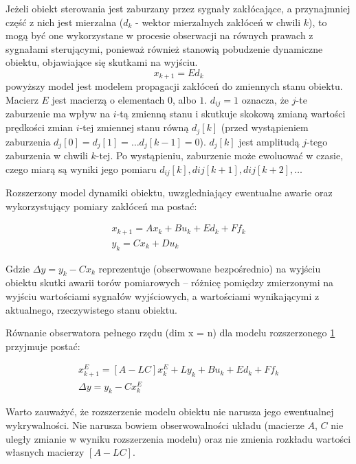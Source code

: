\documentclass{article}
\begin{document}
		Jeżeli obiekt sterowania jest zaburzany przez sygnały zakłócające, a przynajmniej część
		z nich jest mierzalna ($d_k$ - wektor mierzalnych zakłóceń w chwili $k$), to mogą być one
		wykorzystane w procesie obserwacji na równych prawach z sygnałami sterującymi,
		ponieważ również stanowią pobudzenie dynamiczne obiektu, objawiające się skutkami
		na wyjściu.
		\begin{equation}
			x_{k+1} = Ed_k
		\end{equation}
		powyższy model jest modelem propagacji zakłóceń do zmiennych stanu obiektu. Macierz $E$ jest
		macierzą o elementach $0$, albo $1$. $d_{ij} = 1$ oznacza, że $j$-te zaburzenie ma wpływ na $i$-tą
		zmienną stanu i skutkuje skokową zmianą wartości prędkości zmian $i$-tej zmiennej stanu
		równą $d_j[k]$ (przed wystąpieniem zaburzenia $d_j[0]= d_j[1]= \ldots d_j[k-1]= 0$).
		$d_j[k]$ jest amplitudą $j$-tego zaburzenia w chwili $k$-tej. Po wystąpieniu, zaburzenie może
		ewoluować w czasie, czego miarą są wyniki jego pomiaru $d_{ij}[k], dij[k+1], dij[k+2], \ldots $ 

		Rozszerzony model dynamiki obiektu, uwzgledniający ewentualne awarie oraz
		wykorzystujący pomiary zakłóceń ma postać:
		\begin{figure}[H]
			\begin{align*}
				x_{k+1} = Ax_k + Bu_k + Ed_k + Ff_k \\ 
				y_k = C x_k + Du_k
			\end{align*}
			\label{rozszerzonymodel}
		\end{figure}
		Gdzie $\Delta y = y_k - C x_k $ reprezentuje (obserwowane bezpośrednio) na wyjściu obiektu skutki
		awarii torów pomiarowych – różnicę pomiędzy zmierzonymi na wyjściu wartościami sygnałów
		wyjściowych, a wartościami wynikającymi z aktualnego, rzeczywistego stanu obiektu.

		Równanie obserwatora pełnego rzędu (dim x = n) dla modelu rozszerzonego \ref{rozszerzonymodel} przyjmuje
		postać:
		\begin{figure}[H]
			\begin{align*}
				x^E_{k+1} = [A - LC]x^E_k + Ly_k + Bu_k + Ed_k + Ff_k \\ 
				\Delta y = y_k - Cx^E_k
			\end{align*}
			\label{pelnyobserwator}
		\end{figure}
		Warto zauważyć, że rozszerzenie modelu obiektu nie narusza jego ewentualnej
		wykrywalności. Nie narusza bowiem obserwowalności układu (macierze $A$, $C$ nie uległy
		zmianie w wyniku rozszerzenia modelu) oraz nie zmienia rozkładu wartości własnych
		macierzy $[A - LC]$.
\end{document}
